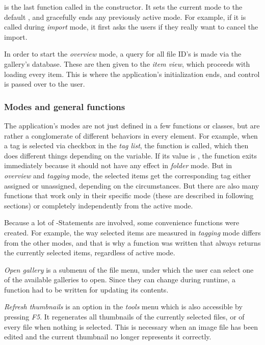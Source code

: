 is the last function called in the constructor. It sets the current mode
to the default , and gracefully ends any previously active
mode. For example, if it is called during \emph{import} mode, it first asks the users if they really want to cancel the import.

In order to start the \emph{overview} mode, a query for all file ID's is made via the
gallery's database. These are then given to the \emph{item view}, which proceeds
with loading every item. This is where the application's initialization
ends, and control is passed over to the user. 

\subsubsection{Modes and general functions}

The application's modes are not just defined in a few functions or classes, but are rather a conglomerate of 
different behaviors in every element. For example, when a tag is selected via checkbox in the \emph{tag list}, the function  is called, which then does different things depending on the  variable. If its value is , the function exits immediately because it should not have any effect in \emph{folder} mode. But in \emph{overview} and \emph{tagging} mode, the selected items get the corresponding tag either assigned or unassigned, depending on the circumstances. But there are also many functions that work only in their specific mode (these are described in following sections) or completely independently from the active mode.

Because a lot of -Statements are involved, some convenience functions were created. For example, the way selected items are measured in \emph{tagging} mode differs from the other modes, and that is why a function was written that always returns the currently selected items, regardless of active mode.

\emph{Open gallery} is a submenu of the file menu, under which the user can
select one of the available galleries to open. Since they can change during
runtime, a function had to be written for updating its contents.

\emph{Refresh thumbnails} is an option in the \emph{tools} menu which is also accessible by pressing \emph{F5}. It regenerates all thumbnails of the currently selected files, or of every file when nothing is selected. This is necessary when an image file has been edited and the current thumbnail no longer represents it correctly.

